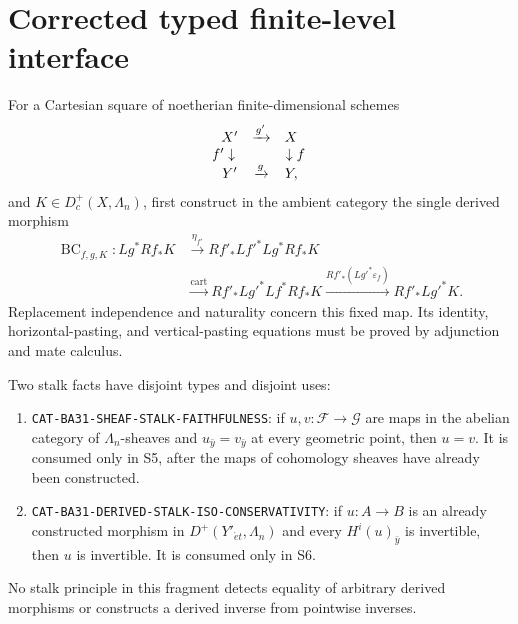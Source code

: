 \section{Corrected typed finite-level interface}\label{chap:corrected-pbc}
For a Cartesian square of noetherian finite-dimensional schemes
\[
\begin{array}{ccc}
X'&\xrightarrow{g'}&X\\
\mathllap{f'}\downarrow&&\downarrow\mathrlap{f}\\
Y'&\xrightarrow{g}&Y,
\end{array}
\]
and $K\in D_c^+(X,\Lambda_n)$, first construct in the ambient category the
single derived morphism
\[
\begin{split}
 \operatorname{BC}_{f,g,K}:Lg^*Rf_*K
 &\xrightarrow{\eta_{f'}}Rf'_*Lf'^*Lg^*Rf_*K\\
 &\xrightarrow{\mathrm{cart}}Rf'_*Lg'^*Lf^*Rf_*K
 \xrightarrow{Rf'_*(Lg'^*\varepsilon_f)}Rf'_*Lg'^*K.
\end{split}
\tag{BA31-MATE}
\]
Replacement independence and naturality concern this fixed map.  Its identity,
horizontal-pasting, and vertical-pasting equations must be proved by adjunction
and mate calculus.

Two stalk facts have disjoint types and disjoint uses:
\begin{enumerate}
\item \texttt{CAT-BA31-SHEAF-STALK-FAITHFULNESS}: if
      $u,v:\mathcal F\to\mathcal G$ are maps in the abelian category of
      $\Lambda_n$-sheaves and $u_{\bar y}=v_{\bar y}$ at every geometric
      point, then $u=v$.  It is consumed only in S5, after the maps of
      cohomology sheaves have already been constructed.
\item \texttt{CAT-BA31-DERIVED-STALK-ISO-CONSERVATIVITY}: if
      $u:A\to B$ is an already constructed morphism in
      $D^+(Y'_{\acute et},\Lambda_n)$ and every
      $H^i(u)_{\bar y}$ is invertible, then $u$ is invertible.  It is consumed
      only in S6.
\end{enumerate}
No stalk principle in this fragment detects equality of arbitrary derived
morphisms or constructs a derived inverse from pointwise inverses.

